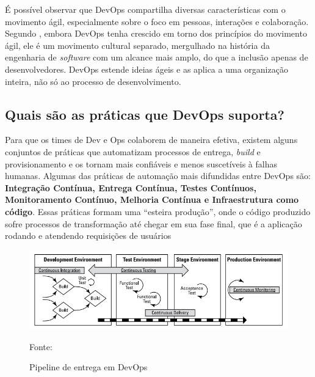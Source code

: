 \documentclass[twoside,english,brazilian]{UNISINOSartigo}
\newcommand{\source}[1]{\caption*{Fonte: {#1}} }
\begin{document}
É possível observar que DevOps compartilha diversas características com o movimento ágil, especialmente sobre o foco em pessoas, interações e colaboração. Segundo , embora DevOps tenha crescido em torno dos princípios do movimento ágil, ele é um movimento cultural separado, mergulhado na história da engenharia de \textit{software} com um alcance mais amplo, do que a inclusão apenas de desenvolvedores. DevOps estende ideias ágeis e as aplica a uma organização inteira, não só ao processo de desenvolvimento.  

\subsection{Quais são as práticas que DevOps suporta? }
Para que os times de Dev e Ops colaborem de maneira efetiva, existem alguns conjuntos de práticas que automatizam processos de entrega, \textit{build} e provisionamento e os tornam mais confiáveis e menos suscetíveis à falhas humanas. Algumas das práticas de automação mais difundidas entre DevOps são: \textbf{Integração Contínua, Entrega Contínua, Testes Contínuos, Monitoramento Contínuo, Melhoria Contínua
e Infraestrutura como código}. Essas práticas formam uma ``esteira produção'', onde o código produzido sofre processos de transformação até chegar em sua fase final, que é a aplicação rodando e atendendo requisições de usuários

\begin{figure}[h]
    \centering
    \caption{Pipeline de entrega em DevOps}
    \includegraphics[scale=.7]{imagens/pipeline.jpg}
    \source{}
    \label{fig:pipeline}
\end{figure}



\end{document}
